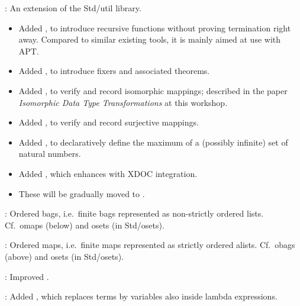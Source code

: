 
\begin{frame}

\newlibtitle

:
An extension of the Std/util library.
\begin{itemize}
\item
Added ,
to introduce recursive functions without proving termination right away.
Compared to similar existing tools, it is mainly aimed at use with APT.
\item
Added , to introduce fixers and associated theorems.
\item
Added , to verify and record isomorphic mappings;
described in the paper
\textit{Isomorphic Data Type Transformations} at this workshop.
\item
Added , to verify and record surjective mappings.
\item
Added ,
to declaratively define the maximum of
a (possibly infinite) set of natural numbers.
\item
Added , which enhances  with XDOC integration.
\item
These will be gradually moved to .
\end{itemize}

\end{frame}


\begin{frame}

\newlibtitle

:
Ordered bags, i.e.\ finite bags represented as non-strictly ordered lists.
Cf.\ omaps (below) and osets (in Std/osets).

\separation

:
Ordered maps, i.e.\ finite maps represented as strictly ordered alists.
Cf.\ obags (above) and osets (in Std/osets).

\separation

:
Improved .

\separation

:
Added ,
which replaces terms by variables also inside lambda expressions.

\end{frame}

